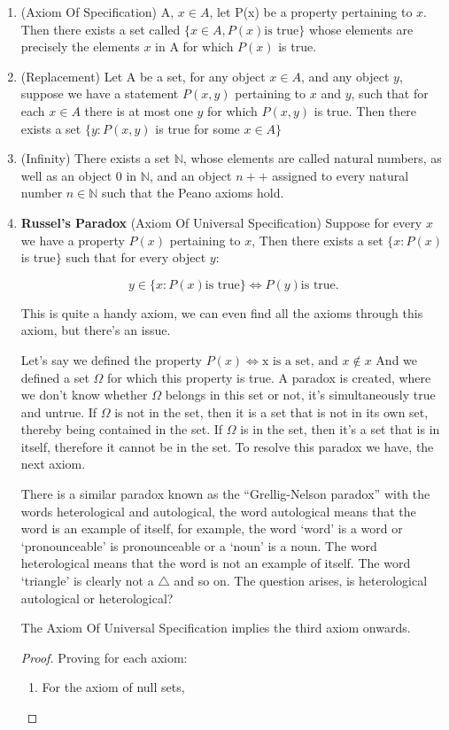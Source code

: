 \documentclass[11pt]{report}
\begin{document}
\begin{enumerate}
\begin{proof}
		      The two statements are equivalent.
	      \end{proof}
	\item (Axiom Of Specification) A, $x \in A$, let P(x) be a property pertaining to $x$. Then there exists a set called $\{x \in A, P(x) \text{is true}\}$ whose elements are precisely the elements $x$ in A for which $P(x)$ is true.
	\item (Replacement) Let A be a set, for any object $x \in A$, and any object $y$, suppose we have a statement $P(x,y)$ pertaining to $x$ and $y$, such that for each $x \in A$ there is at most one $y$ for which $P(x,y)$ is true. Then there exists a set $\{y : P(x,y)$ is true for some $x \in A\}$
	\item (Infinity) There exists a set $\mathbb{N}$, whose elements are called natural numbers, as well as an object $0$ in $\mathbb{N}$, and an object $n++$ assigned to every natural number $n \in \mathbb{N}$ such that the Peano axioms hold.

	\item \textbf{Russel's Paradox} (Axiom Of Universal Specification) Suppose for every $x$ we have a property $P(x)$ pertaining to $x$, Then there exists a set $\{x : P(x)$ is true$\}$ such that for every object $y$:

	      $$ y \in \{ x : P(x) \text{is true} \} \Leftrightarrow P(y) \text{is true.}$$

	      This is quite a handy axiom, we can even find all the axioms through this axiom, but there's an issue.

	      Let's say we defined the property $P(x) \Leftrightarrow \text{x is a set, and } x \notin x$
	      And we defined a set $\Omega$ for which this property is true.
	      A paradox is created, where we don't know whether $\Omega$ belongs in this set or not, it's simultaneously true and untrue. If $\Omega$ is not in the set, then it is a set that is not in its own set, thereby being contained in the set. If $\Omega$ is in the set, then it's a set that is in itself, therefore it cannot be in the set.
	      To resolve this paradox we have, the next axiom.
	      \begin{note}
		      There is a similar paradox known as the ``Grellig-Nelson paradox'' with the words heterological and autological, the word autological means that the word is an example of itself, for example, the word `word' is a word or `pronounceable' is pronounceable or a `noun' is a noun. The word heterological means that the word is not an example of itself. The word `triangle' is clearly not a $\triangle$ and so on. The question arises, is heterological autological or heterological?
	      \end{note}
	      \begin{prop}
		      The Axiom Of Universal Specification implies the third axiom onwards.
	      \end{prop}
	      \begin{proof}
		      Proving for each axiom:
		      \begin{enumerate}
			      \item  For the axiom of null sets,


\end{enumerate}
\end{proof}
\end{enumerate}
\end{document}

